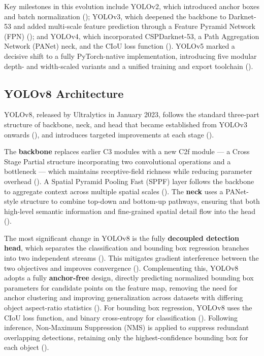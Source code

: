 \vspace{1em}

Key milestones in this evolution include YOLOv2, which introduced anchor 
boxes and batch normalization (\cite{vijayakumar2024yolo}); YOLOv3, which 
deepened the backbone to Darknet-53 and added multi-scale feature 
prediction through a Feature Pyramid Network (FPN) (\cite{vijayakumar2024yolo}); 
and YOLOv4, which incorporated CSPDarknet-53, a Path Aggregation Network 
(PANet) neck, and the CIoU loss function (\cite{vijayakumar2024yolo}). 
YOLOv5 marked a decisive shift to a fully PyTorch-native implementation, 
introducing five modular depth- and width-scaled variants and a unified 
training and export toolchain (\cite{vijayakumar2024yolo, sapkota2025ultralytics}).


\subsection{YOLOv8 Architecture}

YOLOv8, released by Ultralytics in January 2023, follows the standard 
three-part structure of backbone, neck, and head that became established 
from YOLOv3 onwards (\cite{vijayakumar2024yolo}), and introduces targeted 
improvements at each stage (\cite{vijayakumar2024yolo, sapkota2025ultralytics}).

\vspace{1em}

The \textbf{backbone} replaces earlier C3 modules with a new C2f module 
--- a Cross Stage Partial structure incorporating two convolutional 
operations and a bottleneck --- which maintains receptive-field richness 
while reducing parameter overhead (\cite{sapkota2025ultralytics}). A Spatial 
Pyramid Pooling Fast (SPPF) layer follows the backbone to aggregate 
context across multiple spatial scales (\cite{sapkota2025ultralytics}). The 
\textbf{neck} uses a PANet-style structure to combine top-down and 
bottom-up pathways, ensuring that both high-level semantic information and 
fine-grained spatial detail flow into the head (\cite{vijayakumar2024yolo}).

\vspace{1em}

The most significant change in YOLOv8 is the fully \textbf{decoupled 
detection head}, which separates the classification and bounding box 
regression branches into two independent streams (\cite{sapkota2025ultralytics}). 
This mitigates gradient interference between the two objectives and 
improves convergence (\cite{sapkota2025ultralytics}). Complementing this, 
YOLOv8 adopts a fully \textbf{anchor-free} design, directly predicting 
normalized bounding box parameters for candidate points on the feature 
map, removing the need for anchor clustering and improving generalization 
across datasets with differing object aspect-ratio statistics 
(\cite{vijayakumar2024yolo, sapkota2025ultralytics}). For bounding box 
regression, YOLOv8 uses the CIoU loss function, and binary cross-entropy 
for classification (\cite{vijayakumar2024yolo}). Following inference, 
Non-Maximum Suppression (NMS) is applied to suppress redundant overlapping 
detections, retaining only the highest-confidence bounding box for each 
object (\cite{vijayakumar2024yolo}).

